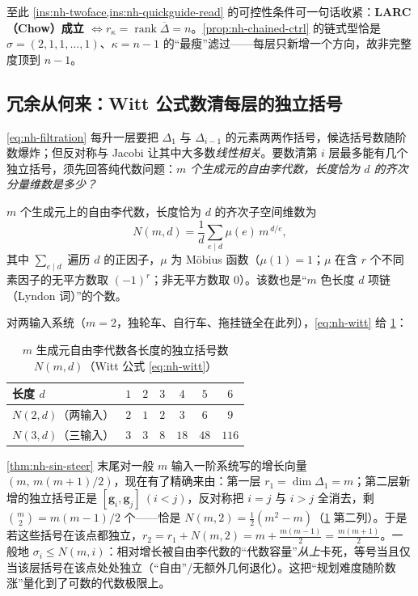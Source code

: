 \noindent 至此 \cref{ins:nh-twoface,ins:nh-quickguide-read} 的可控性条件可一句话收紧：\textbf{LARC（Chow）成立 $\iff r_{\kappa}=\operatorname{rank}\overline{\Delta}=n$}。\cref{prop:nh-chained-ctrl} 的链式型恰是 $\sigma=(2,1,1,\dots,1)$、$\kappa=n-1$ 的“最瘦”滤过——每层只新增一个方向，故非完整度顶到 $n-1$。

\subsection{冗余从何来：Witt 公式数清每层的独立括号}
\label{sec:nh-witt}

\cref{eq:nh-filtration} 每升一层要把 $\Delta_1$ 与 $\Delta_{i-1}$ 的元素两两作括号，候选括号数随阶数爆炸；但反对称与 Jacobi 让其中大多数\emph{线性相关}。要数清第 $i$ 层最多能有几个独立括号，须先回答纯代数问题：\emph{$m$ 个生成元的自由李代数，长度恰为 $d$ 的齐次分量维数是多少？}

\begin{theorem}\label{thm:nh-witt}
$m$ 个生成元上的自由李代数，长度恰为 $d$ 的齐次子空间维数为
\begin{equation}
  N(m,d)=\frac{1}{d}\sum_{e\mid d}\mu(e)\,m^{\,d/e},
  \label{eq:nh-witt}
\end{equation}
其中 $\sum_{e\mid d}$ 遍历 $d$ 的正因子，$\mu$ 为 Möbius 函数（$\mu(1)=1$；$\mu$ 在含 $r$ 个不同素因子的无平方数取 $(-1)^r$；非无平方数取 $0$）。该数也是“$m$ 色长度 $d$ 项链（Lyndon 词）”的个数。
\end{theorem}

\noindent 对两输入系统（$m=2$，独轮车、自行车、拖挂链全在此列），\cref{eq:nh-witt} 给 \cref{tab:nh-witt}：

\begin{table}[H]\centering\small
\caption{$m$ 生成元自由李代数各长度的独立括号数 $N(m,d)$（Witt 公式 \cref{eq:nh-witt}）}
\label{tab:nh-witt}
\begin{tabular}{lcccccc}
\toprule
长度 $d$ & $1$ & $2$ & $3$ & $4$ & $5$ & $6$ \\
\midrule
$N(2,d)$（两输入） & $2$ & $1$ & $2$ & $3$ & $6$ & $9$ \\
$N(3,d)$（三输入） & $3$ & $3$ & $8$ & $18$ & $48$ & $116$ \\
\bottomrule
\end{tabular}
\end{table}

\begin{insight}\label{ins:nh-growth-firstorder}
\cref{thm:nh-sin-steer} 末尾对一般 $m$ 输入一阶系统写的增长向量 $(m,\,m(m{+}1)/2)$，现在有了精确来由：第一层 $r_1=\dim\Delta_1=m$；第二层新增的独立括号正是 $[\mathbf{g}_i,\mathbf{g}_j]\ (i<j)$，反对称把 $i=j$ 与 $i>j$ 全消去，剩 $\binom{m}{2}=m(m-1)/2$ 个——恰是 $N(m,2)=\tfrac1{2}(m^2-m)$（\cref{tab:nh-witt} 第二列）。于是若这些括号在该点都独立，$r_2=r_1+N(m,2)=m+\tfrac{m(m-1)}2=\tfrac{m(m+1)}2$。一般地 $\sigma_i\le N(m,i)$：相对增长被自由李代数的“代数容量”\emph{从上}卡死，等号当且仅当该层括号在该点处处独立（“自由”/无额外几何退化）。这把“规划难度随阶数涨”量化到了可数的代数极限上。
\end{insight}

